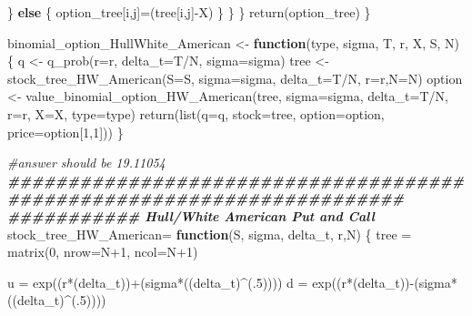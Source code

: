 \documentclass[
]{article}
\newenvironment{Shaded}{\begin{snugshade}}{\end{snugshade}}
\newcommand{\AttributeTok}[1]{\textcolor[rgb]{0.77,0.63,0.00}{#1}}
\newcommand{\CommentTok}[1]{\textcolor[rgb]{0.56,0.35,0.01}{\textit{#1}}}
\newcommand{\ControlFlowTok}[1]{\textcolor[rgb]{0.13,0.29,0.53}{\textbf{#1}}}
\newcommand{\DecValTok}[1]{\textcolor[rgb]{0.00,0.00,0.81}{#1}}
\newcommand{\DocumentationTok}[1]{\textcolor[rgb]{0.56,0.35,0.01}{\textbf{\textit{#1}}}}
\newcommand{\FunctionTok}[1]{\textcolor[rgb]{0.00,0.00,0.00}{#1}}
\newcommand{\NormalTok}[1]{#1}
\newcommand{\OtherTok}[1]{\textcolor[rgb]{0.56,0.35,0.01}{#1}}
\newcommand{\SpecialCharTok}[1]{\textcolor[rgb]{0.00,0.00,0.00}{#1}}
\begin{document}
\begin{Shaded}
\begin{Highlighting}[]
\NormalTok{      \} }
      \ControlFlowTok{else}\NormalTok{ \{}
\NormalTok{        option\_tree[i,j]}\OtherTok{=}\NormalTok{(tree[i,j]}\SpecialCharTok{{-}}\NormalTok{X)}
\NormalTok{      \}}
\NormalTok{    \}}
\NormalTok{  \}}
  \FunctionTok{return}\NormalTok{(option\_tree)}
\NormalTok{\}}

\NormalTok{binomial\_option\_HullWhite\_American }\OtherTok{\textless{}{-}} \ControlFlowTok{function}\NormalTok{(type, sigma, T, r, X, S, N) \{}
\NormalTok{  q }\OtherTok{\textless{}{-}} \FunctionTok{q\_prob}\NormalTok{(}\AttributeTok{r=}\NormalTok{r, }\AttributeTok{delta\_t=}\NormalTok{T}\SpecialCharTok{/}\NormalTok{N, }\AttributeTok{sigma=}\NormalTok{sigma)}
\NormalTok{  tree }\OtherTok{\textless{}{-}} \FunctionTok{stock\_tree\_HW\_American}\NormalTok{(}\AttributeTok{S=}\NormalTok{S, }\AttributeTok{sigma=}\NormalTok{sigma, }\AttributeTok{delta\_t=}\NormalTok{T}\SpecialCharTok{/}\NormalTok{N, }\AttributeTok{r=}\NormalTok{r,}\AttributeTok{N=}\NormalTok{N)}
\NormalTok{  option }\OtherTok{\textless{}{-}} \FunctionTok{value\_binomial\_option\_HW\_American}\NormalTok{(tree, }\AttributeTok{sigma=}\NormalTok{sigma, }\AttributeTok{delta\_t=}\NormalTok{T}\SpecialCharTok{/}\NormalTok{N, }\AttributeTok{r=}\NormalTok{r, }\AttributeTok{X=}\NormalTok{X, }\AttributeTok{type=}\NormalTok{type)}
  \FunctionTok{return}\NormalTok{(}\FunctionTok{list}\NormalTok{(}\AttributeTok{q=}\NormalTok{q, }\AttributeTok{stock=}\NormalTok{tree, }\AttributeTok{option=}\NormalTok{option, }\AttributeTok{price=}\NormalTok{option[}\DecValTok{1}\NormalTok{,}\DecValTok{1}\NormalTok{]))}
\NormalTok{\}}

\CommentTok{\#answer should be 19.11054}
\DocumentationTok{\#\#\#\#\#\#\#\#\#\#\#\#\#\#\#\#\#\#\#\#\#\#\#\#\#\#\#\#\#\#\#\#\#\#\#\#\#\#\#\#\#\#\#\#\#\#\#\#\#\#\#\#\#\#\#\#\#\#\#\#\#\#\#\#\#\#\#\#\#\#\#}
\DocumentationTok{\#\#\#\#\#\#\#\#\#\#\# Hull/White American Put and Call}
\NormalTok{stock\_tree\_HW\_American}\OtherTok{=} \ControlFlowTok{function}\NormalTok{(S, sigma, delta\_t, r,N) \{}
\NormalTok{  tree }\OtherTok{=} \FunctionTok{matrix}\NormalTok{(}\DecValTok{0}\NormalTok{, }\AttributeTok{nrow=}\NormalTok{N}\SpecialCharTok{+}\DecValTok{1}\NormalTok{, }\AttributeTok{ncol=}\NormalTok{N}\SpecialCharTok{+}\DecValTok{1}\NormalTok{)}
  
\NormalTok{  u }\OtherTok{=} \FunctionTok{exp}\NormalTok{((r}\SpecialCharTok{*}\NormalTok{(delta\_t))}\SpecialCharTok{+}\NormalTok{(sigma}\SpecialCharTok{*}\NormalTok{((delta\_t)}\SpecialCharTok{\^{}}\NormalTok{(.}\DecValTok{5}\NormalTok{))))}
\NormalTok{  d }\OtherTok{=} \FunctionTok{exp}\NormalTok{((r}\SpecialCharTok{*}\NormalTok{(delta\_t))}\SpecialCharTok{{-}}\NormalTok{(sigma}\SpecialCharTok{*}\NormalTok{((delta\_t)}\SpecialCharTok{\^{}}\NormalTok{(.}\DecValTok{5}\NormalTok{))))}
  

\end{Highlighting}
\end{Shaded}
\end{document}
